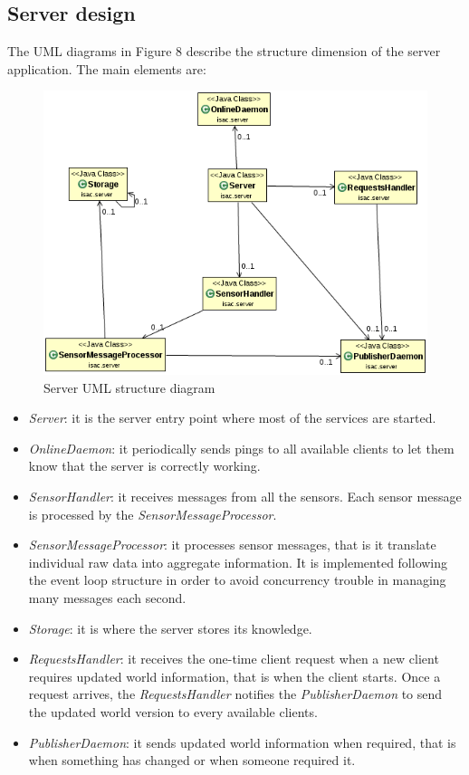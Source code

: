 \documentclass[11pt]{article}
\begin{document}
\subsection{Server design}
The UML diagrams in Figure 8 describe the structure dimension of the server application. The main elements are:
\begin{figure}
  \centering
	\includegraphics[scale=0.8]{serverUML}
  \caption{Server UML structure diagram}
\end{figure}
\begin{itemize}
\item \emph{Server}: it is the server entry point where most of the services are started.
\item \emph{OnlineDaemon}: it periodically sends pings to all available clients to let them know that the server is correctly working.
\item \emph{SensorHandler}: it receives messages from all the sensors. Each sensor message is processed by the \emph{SensorMessageProcessor}.
\item \emph{SensorMessageProcessor}: it processes sensor messages, that is it translate individual raw data into aggregate information. It is implemented following the event loop structure in order to avoid concurrency trouble in managing many messages each second.
\item \emph{Storage}: it is where the server stores its knowledge.
\item \emph{RequestsHandler}: it receives the one-time client request when a new client requires updated world information, that is when the client starts. Once a request arrives, the \emph{RequestsHandler} notifies the \emph{PublisherDaemon} to send the updated world version to every available clients.
\item \emph{PublisherDaemon}: it sends updated world information when required, that is when something has changed or when someone required it.
\end{itemize}
\end{document}
